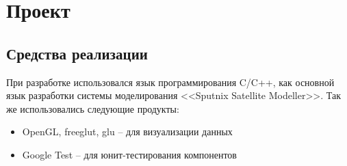 \chapter{Проект}
\section{Средства реализации}
\noindent\indent При разработке использовался язык программирования C/C++,
как основной язык разработки системы моделирования <<Sputnix Satellite Modeller>>.
Так же использовались следующие продукты:
\begin{itemize}
    \item OpenGL, freeglut, glu -- для визуализации данных
    \item Google Test -- для юнит-тестирования компонентов
\end{itemize}
